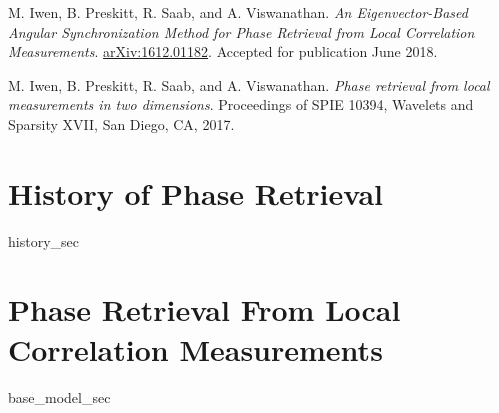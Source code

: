 \documentclass[12pt]{ucsd-thesis-2018}
\begin{document}
\begin{frontmatter}
\begin{vitapage}
\begin{publications}
\item  M. Iwen, B. Preskitt, R. Saab, and A. Viswanathan.  \emph{An Eigenvector-Based Angular Synchronization Method for Phase Retrieval from Local Correlation Measurements}.  \href{https://arxiv.org/abs/1612.01182}{arXiv:1612.01182}.  Accepted for publication June 2018.
  \item M. Iwen, B. Preskitt, R. Saab, and A. Viswanathan.  \emph{Phase retrieval from local measurements in two dimensions}.  Proceedings of SPIE 10394, Wavelets and Sparsity XVII, San Diego, CA, 2017.
\end{publications}

\end{vitapage}

\begin{abstract}

\end{abstract}

\end{frontmatter}

\chapter{History of Phase Retrieval}
{history_sec}

\chapter{Phase Retrieval From Local Correlation Measurements}
\label{ch:our_model}
\label{ch:base_model}
{base_model_sec}
\end{document}
